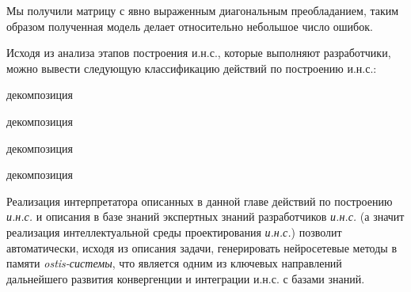 \begin{textitemize}
Мы получили матрицу с явно выраженным диагональным преобладанием, таким образом полученная модель делает относительно небольшое число ошибок.
\end{textitemize}

Исходя из анализа этапов построения и.н.с., которые выполняют разработчики, можно вывести следующую классификацию действий по построению и.н.с.:

\begin{SCn}
	\begin{scnrelfromset}{декомпозиция}
		\begin{scnrelfromset}{декомпозиция}
		\end{scnrelfromset}

		\begin{scnrelfromset}{декомпозиция}
		\end{scnrelfromset}

		\begin{scnrelfromset}{декомпозиция}
		\end{scnrelfromset}
	\end{scnrelfromset}
\end{SCn}

Реализация интерпретатора описанных в данной главе действий по построению \textit{и.н.с.} и описания в базе знаний экспертных знаний разработчиков\textit{ и.н.с.} (а значит реализация интеллектуальной среды проектирования \textit{и.н.с.}) позволит автоматически, исходя из описания задачи, генерировать нейросетевые методы в памяти \textit{ostis-системы}, что является одним из ключевых направлений дальнейшего развития конвергенции и интеграции и.н.с. с базами знаний.


